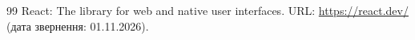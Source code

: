 \begin{thebibliography}{99}
 React: The library for web and native user interfaces. URL: \url{https://react.dev/} (дата звернення: 01.11.2026).
\end{thebibliography}
